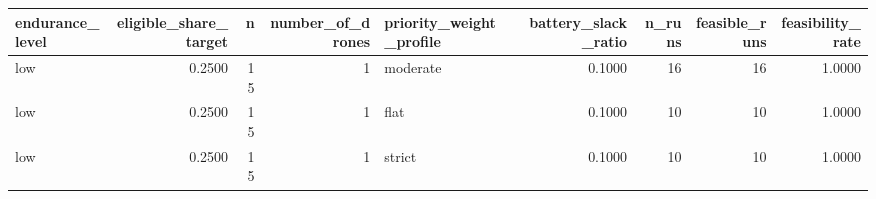 \begin{tabular}{lrrrlrrrr}
\toprule
endurance_level & eligible_share_target & n & number_of_drones & priority_weight_profile & battery_slack_ratio & n_runs & feasible_runs & feasibility_rate \\
\midrule
low & 0.2500 & 15 & 1 & moderate & 0.1000 & 16 & 16 & 1.0000 \\
low & 0.2500 & 15 & 1 & flat & 0.1000 & 10 & 10 & 1.0000 \\
low & 0.2500 & 15 & 1 & strict & 0.1000 & 10 & 10 & 1.0000 \\
\bottomrule
\end{tabular}
